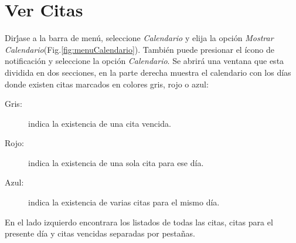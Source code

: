\section{Ver Citas}
\label{sec:verCita}

Dir\'jase a la barra de men\'u, seleccione \emph{Calendario} y elija la opci\'on \emph{Mostrar Calendario}(Fig.\ref{fig:menuCalendario}). Tambi\'en puede presionar el \'icono de notificaci\'on y seleccione la opci\'on \emph{Calendario}. Se abrir\'a una ventana que esta dividida en dos secciones, en la parte derecha muestra el calendario con los d\'ias donde existen citas marcados en colores gris, rojo o azul:
\begin{description}
\item[Gris:] indica la existencia de una cita vencida.
\item[Rojo:] indica la existencia de una sola cita para ese d\'ia.
\item[Azul:] indica la existencia de varias citas para el mismo d\'ia.
\end{description}

En el lado izquierdo encontrara los listados de todas las citas, citas para el presente d\'ia y citas vencidas separadas por pesta\~nas.
  

